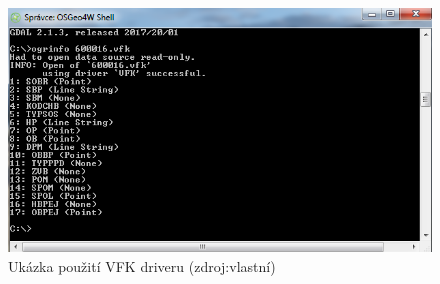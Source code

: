 \begin{figure}[H]
	 \centering
      \includegraphics[width=15cm]{./pictures/vfk_driver.png}
      \caption{Ukázka použití VFK driveru (zdroj:vlastní)}
      \label{fig:vfk_driver}
  \end{figure}
